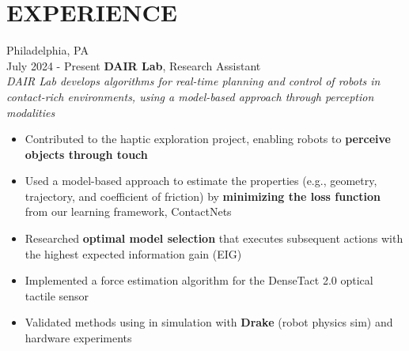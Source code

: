 \section{\textbf{EXPERIENCE}}
    \begin{twocolentry}{
        Philadelphia, PA \\
        July 2024 - Present}
        \textbf{DAIR Lab}, Research Assistant \\
        \textit{DAIR Lab develops algorithms for real-time planning and control of robots in contact-rich environments, using a model-based approach through perception modalities}
        \begin{itemize}[nosep, after=\strut, leftmargin=1em, itemsep=2pt]
            \item Contributed to the haptic exploration project, enabling robots to \textbf{perceive objects through touch}  
            \item Used a model-based approach to estimate the properties (e.g., geometry, trajectory, and coefficient of friction) by \textbf{minimizing the loss function} from our learning framework, ContactNets
            \item Researched \textbf{optimal model selection} that executes subsequent actions with the highest expected information gain (EIG)
            \item Implemented a force estimation algorithm for the DenseTact 2.0 optical tactile sensor 
            \item Validated methods using in simulation with \textbf{Drake} (robot physics sim) and hardware experiments
            \end{itemize}
    \end{twocolentry}

